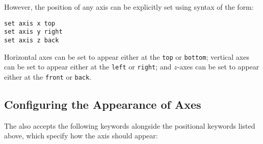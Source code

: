 However, the position of any axis can be explicitly set using syntax of the
form:
\begin{verbatim}
set axis x top
set axis y right
set axis z back
\end{verbatim}
Horizontal axes can be set to appear either at the {\tt top} or {\tt bottom};
vertical axes can be set to appear either at the {\tt left} or {\tt right}; and
$z$-axes can be set to appear either at the {\tt front} or {\tt back}.

\subsection{Configuring the Appearance of Axes}

The  also accepts the following keywords alongside the
positional keywords listed above, which specify how the axis should appear:
